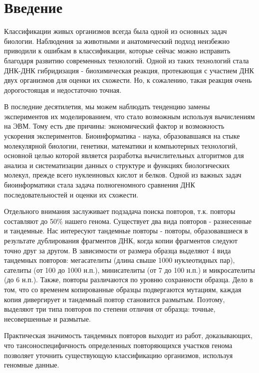 \chapter*{Введение}							%

Классификации живых организмов всегда была одной из основных задач биологии.
Наблюдения за животными и анатомический подход неизбежно приводили к ошибкам
в классификации, которые сейчас можно исправить благодаря развитию современных
технологий. Одной из таких технологий стала ДНК-ДНК гибридизация - биохимическая
реакция, протекающая с участием ДНК двух организмов для оценки их схожести.
Но, к сожалению, такая реакция очень дорогостоящая и недостаточно точная.

В последние десятилетия, мы можем наблюдать тенденцию замены экспериментов
их моделированием, что стало возможным используя вычислениям на ЭВМ. Тому есть
две причины: экономический фактор и возможность ускорения экспериментов.
Биоинформатика - наука, образовавшаяся на стыке молекулярной биологии, генетики,
математики и компьютерных технологий, основной целью которой является разработка
вычислительных алгоритмов для анализа и систематизации данных о структуре и
функциях биологических молекул, прежде всего нуклеиновых кислот и белков.
Одной из важных задач биоинформатики стала задача полногеномного сравнения ДНК
последовательностей и оценки их схожести.

Отдельного внимания заслуживает подзадача поиска повторов, т.к. повторы составляют
до 50\% нашего генома. Существует два вида повторов - разнесенные и тандемные.
Нас интересуют тандемные повторы - повторы, образовавшиеся в результате дублирования
фрагментов ДНК, когда копии фрагментов следуют точно друг за другом.
В зависимости от размера образца выделяют 4 вида тандемных повторов: мегасателиты
(длина свыше 1000 нуклеотидных пар), сателиты (от 100 до 1000 н.п.), минисателиты
(от 7 до 100 н.п.) и микросателиты (до 6 н.п.). Также, повторы различаются
по уровню сохранности образца. Дело в том, что со временем копированные образцы 
подвергаются мутациям, каждая копия дивергирует и тандемный повтор становится
размытым. Поэтому, выделяют три типа повторов по степени отличия от образца:
точные, несовершенные и размытые.

Практическая значимость тандемных повторов выходит из работ, доказывающих, что
тансоноспецифичность определенных повторяющихся участков генома позволяет
уточнить существующую классификацию организмов, используя геномные данные.


